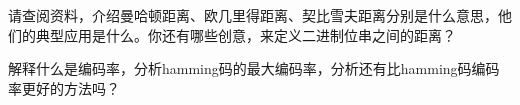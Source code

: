 \documentclass[a4paper, justified]{tufte-handout}
\begin{document}
\beginoptional



\beginot
\begin{ot}[各种花式距离]	
	请查阅资料，介绍曼哈顿距离、欧几里得距离、契比雪夫距离分别是什么意思，他们的典型应用是什么。你还有哪些创意，来定义二进制位串之间的距离？
\end{ot}


\begin{ot}[编码率]	
	解释什么是编码率，分析hamming码的最大编码率，分析还有比hamming码编码率更好的方法吗？
\end{ot}




% 




\beginfb

% 
% 
\end{document}
